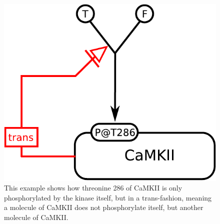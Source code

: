 \begin{figure}[H]
  \centering
  \includegraphics[scale = 0.5]{examples/ex-necessaryStimulation}
  \caption{This example shows how threonine 286 of CaMKII is only phosphorylated by the kinase itself, but in a trans-fashion, meaning a molecule of CaMKII does not phosphorylate itself, but another molecule of CaMKII.}
  \label{fig:ex-necessaryStimulation}
\end{figure}

\normalcolor